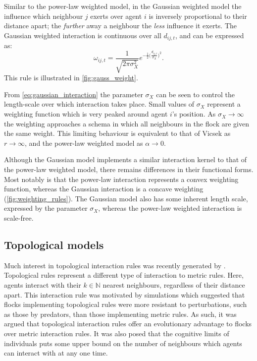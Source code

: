 Similar to the power-law weighted model, in the Gaussian weighted model the
influence which neighbour $j$ exerts over agent $i$ is inversely proportional
to their distance apart; the \emph{further} away a neighbour the \emph{less}
influence it exerts. The Gaussian weighted interaction is continuous over all
$d_{ij,t}$, and can be expressed as:
\begin{equation}
  \label{eq:gaussian_interaction}
  \omega_{ij,t} =
	\frac{1}{\sqrt{2\pi\sigma_X^2}}
	e^{-\frac{1}{2}\big(\frac{d_{ij,t}}{\sigma_X}\big)^2}.
\end{equation}
This rule is illustrated in \cref{fig:gauss_weight}.

From \cref{eq:gaussian_interaction} the parameter $\sigma_X$ can be seen to
control the length-scale over which interaction takes place. Small values of
$\sigma_X$ represent a weighting function which is very peaked around agent
$i$'s position. As $\sigma_X \rightarrow \infty$ the weighting approaches a
schema in which all neighbours in the flock are given the same weight. This
limiting behaviour is equivalent to that of Vicsek as $r\rightarrow\infty$, and
the power-law weighted model as $\alpha\rightarrow0$.

Although the Gaussian model implements a similar interaction kernel to that of
the power-law weighted model, there remains differences in their functional
forms. Most notably is that the power-law interaction represents a convex
weighting function, whereas the Gaussian interaction is a concave weighting
(\cref{fig:weighting_rules}). The Gaussian model also has some inherent length
scale, expressed by the parameter $\sigma_X$, whereas the power-law weighted
interaction is scale-free.

\subsection{Topological models}

Much interest in topological interaction rules was recently generated by
\cite{ballerini08}. Topological rules represent a different type of interaction
to metric rules. Here, agents interact with their $k\in\mathbb{N}$ nearest
neighbours, regardless of their distance apart. This interaction rule was
motivated by simulations which suggested that flocks implementing topological
rules were more resistant to perturbations, such as those by predators, than
those implementing metric rules. As such, it was argued that topological
interaction rules offer an evolutionary advantage to flocks over metric
interaction rules. It was also posed that the cognitive limits of individuals
puts some upper bound on the number of neighbours which agents can interact
with at any one time.

